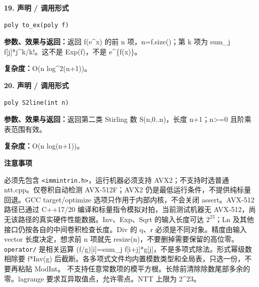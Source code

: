 \documentclass[UTF8,a4paper,10pt]{ctexart}
\newcommand{\TemplNote}[1]{\textbf{注意事项}\par #1\par}
\begin{document}
\noindent\begin{minipage}{\textwidth}
\textbf{19. 声明 / 调用形式}
\begin{lstlisting}
poly to_ex(poly f)
\end{lstlisting}
\textbf{参数、效果与返回：}返回 f(e\textasciicircum{}x) 的前 n 项，n=f.size()；第 k 项为 sum\_j f[j]*j\textasciicircum{}k/k!。这不是 Exp(f)，不是 e\textasciicircum{}\{f(x)\}。

\textbf{复杂度：}O(n log\textasciicircum{}2(n+1))。

\end{minipage}\par\vspace{0.4em}
\noindent\begin{minipage}{\textwidth}
\textbf{20. 声明 / 调用形式}
\begin{lstlisting}
poly S2line(int n)
\end{lstlisting}
\textbf{参数、效果与返回：}返回第二类 Stirling 数 S(n,0..n)，长度 n+1；n>=0 且阶乘表范围有效。

\textbf{复杂度：}O(n log(n+1))。

\TemplNote{必须先包含 \texttt{<immintrin.h>}，运行机器必须支持 AVX2；不支持时选普通 ntt.cpp。仅卷积自动检测 AVX-512F；AVX2 仍是最低运行条件，不提供纯标量回退。GCC target/optimize 选项只作用于内部内核，不会关闭 assert。AVX-512 路径已通过 C++17/20 编译和标量指令模拟对拍，当前测试机器无 AVX-512，尚无该路径的真实硬件性能数据。Inv、Exp、Sqrt 的输入长度可达 $2^{23}$；Ln 及其他接口仍按各自的中间卷积检查长度。Div 的 q、r 必须是不同对象。精度由输入 vector 长度决定，想求前 n 项就先 resize(n)，不要删掉需要保留的高位零。\texttt{operator/} 是相关运算 (f/g)[i]=sum\_j f[i+j]*g[j]，不是多项式除法。形式幂级数相除要 f*Inv(g) 后截断。各多项式文件均内置模数类型和全局表，只选一份，不要再粘贴 ModInt。 不支持任意常数项的模平方根。长除前清除除数尾部多余的零。lagrange 要求互异取值点，允许零点。NTT 上限为 2\textasciicircum{}23。}
\end{minipage}\par\vspace{0.4em}
\end{document}
